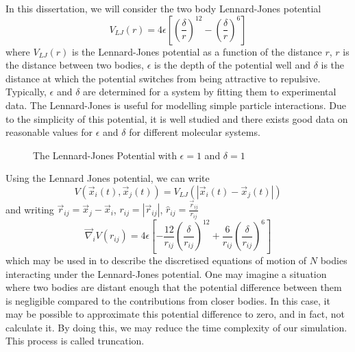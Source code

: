 %
In this dissertation, we will consider the two body Lennard-Jones potential
\begin{equation}
    V_{LJ}(r) = 4\epsilon \left[
        \left( \frac{\delta}{r} \right)^{12}
        - \left( \frac{\delta}{r} \right)^{6}
    \right]
\end  {equation}
where $V_{LJ}(r)$ is the Lennard-Jones potential as
a function of the distance $r$,
$r$ is the distance between two bodies,
$\epsilon$ is the depth of the potential well and
$\delta$ is the distance at which
the potential switches from being attractive to repulsive.
Typically, $\epsilon$ and $\delta$ are determined for a system by
fitting them to experimental data.
%
The Lennard-Jones is useful for modelling simple particle interactions.
%
Due to the simplicity of this potential,
it is well studied and there exists good data on
reasonable values for $\epsilon$ and $\delta$ for
different molecular systems.
%
\begin{figure}
    \label{fig:lennard_jones_potential}
    
    \caption{The Lennard-Jones Potential with $\epsilon = 1$ and $\delta = 1$}
\end  {figure}

%
Using the Lennard Jones potential, we can write
\begin{equation}
    V(\vec{x}_i(t), \vec{x}_j(t)) = V_{LJ}(|\vec{x}_i(t) - \vec{x}_j(t)|)
\end  {equation}
and writing $\vec{r}_{ij} = \vec{x}_j - \vec{x}_i$,
$r_{ij} = |\vec{r}_{ij}|$, $\hat{r}_{ij} = \frac{\vec{r}_{ij}}{r_{ij}}$
\begin{equation}
    \vec{\nabla}_i V(r_{ij}) = 4\epsilon \left[
        - \frac{12}{r_{ij}} \left( \frac{\delta}{r_{ij}} \right)^{12}
        + \frac{6}{r_{ij}} \left( \frac{\delta}{r_{ij}} \right)^{6}
    \right]
\end  {equation}
which may be used in  to describe
the discretised equations of motion of $N$ bodies interacting under the
Lennard-Jones potential.
%
One may imagine a situation where two bodies are distant enough
that the potential difference between them is negligible compared
to the contributions from closer bodies.
%
In this case, it may be possible to approximate this potential difference
to zero, and in fact, not calculate it.
%
By doing this, we may reduce the time complexity of our simulation.
%
This process is called truncation.


